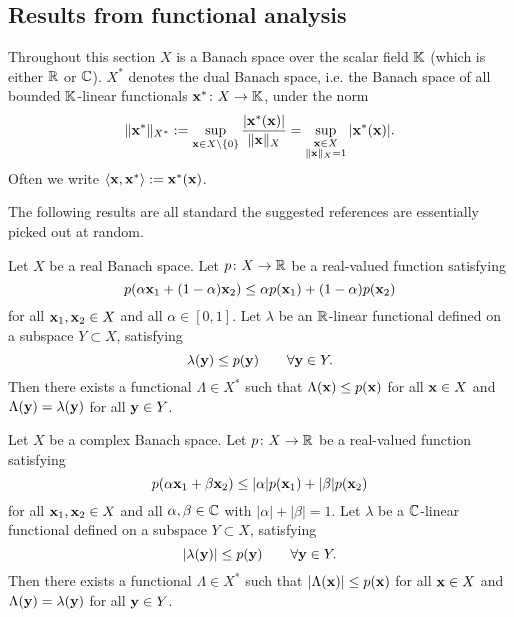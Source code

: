 \subsection{Results from functional analysis}

Throughout this section $X$ is a Banach space over the scalar field $\mathbb{K}$ (which is either $\mathbb{R}$ or $\mathbb{C}$).
$X^*$ denotes the dual Banach space, i.e. the Banach space of all bounded $\mathbb{K}$-linear functionals $\mathbf{x}^* \colon X \rightarrow \mathbb{K}$, under the norm
\begin{equation*}
  \|\mathbf{x}^*\|_{X^*} := \sup_{\mathbf{x} \in X \setminus \{0\}} \frac{|\mathbf{x}^*(\mathbf{x})|}{\|\mathbf{x}\|_{X}} = \sup_{\substack{\mathbf{x} \in X \\ \|\mathbf{x}\|_{X} = 1}} |\mathbf{x}^*(\mathbf{x})|.
\end{equation*}
Often we write $\langle \mathbf{x}, \mathbf{x}^* \rangle := \mathbf{x}^*(\mathbf{x})$.

The following results are all standard the suggested references are essentially picked out at random.

\cite[Section III.3]{RS80}

\begin{thm}
  Let $X$ be a real Banach space.
  Let $p \colon X \rightarrow \mathbb{R}$ be a real-valued function satisfying
  \begin{equation*}
    p(\alpha \mathbf{x}_1 + (1-\alpha) \mathbf{x}_2) \leq \alpha p(\mathbf{x}_1) + (1-\alpha)p(\mathbf{x}_2)
  \end{equation*}
  for all $\mathbf{x}_1, \mathbf{x}_2 \in X$ and all $\alpha \in  [0,1]$.
  Let $\lambda$ be an $\mathbb{R}$-linear functional defined on a subspace $Y \subset X$, satisfying
  \begin{equation*}
    \lambda(\mathbf{y}) \leq p(\mathbf{y}) \qquad \forall \mathbf{y} \in Y.
  \end{equation*}
  Then there exists a functional $\Lambda \in X^*$ such that $\Lambda(\mathbf{x}) \leq p(\mathbf{x})$ for all $\mathbf{x} \in X$ and $\Lambda(\mathbf{y}) = \lambda(\mathbf{y})$ for all $\mathbf{y} \in Y$.
\end{thm}

\begin{thm}
  Let $X$ be a complex Banach space.
  Let $p \colon X \rightarrow \mathbb{R}$ be a real-valued function satisfying
  \begin{equation*}
    p(\alpha \mathbf{x}_1 + \beta \mathbf{x}_2) \leq |\alpha|p(\mathbf{x}_1) + |\beta|p(\mathbf{x}_2)
  \end{equation*}
  for all $\mathbf{x}_1, \mathbf{x}_2 \in X$ and all $\alpha,\beta \in \mathbb{C}$ with $|\alpha| + |\beta| = 1$.
  Let $\lambda$ be a $\mathbb{C}$-linear functional defined on a subspace $Y \subset X$, satisfying
  \begin{equation*}
    |\lambda(\mathbf{y})| \leq p(\mathbf{y}) \qquad \forall \mathbf{y} \in Y.
  \end{equation*}
  Then there exists a functional $\Lambda \in X^*$ such that $|\Lambda(\mathbf{x})| \leq p(\mathbf{x})$ for all $\mathbf{x} \in X$ and $\Lambda(\mathbf{y}) = \lambda(\mathbf{y})$ for all $\mathbf{y} \in Y$.
\end{thm}

